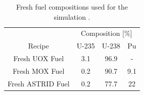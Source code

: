 \begin{table}[h]
    \centering
        \begin{tabular}{cccc}
            \hline
             & \multicolumn{3}{c}{ Composition [\%]} \\
            Recipe & U-235  & U-238  & Pu \\ 
            \hline
            Fresh \gls{UOX} Fuel & 3.1 & 96.9 & -   \\ 
            Fresh \gls{MOX} Fuel & 0.2 & 90.7 & 9.1 \\ 
            Fresh \gls{ASTRID} Fuel & 0.2 & 77.7 & 22 \\
            \hline
        \end{tabular}
        \caption{Fresh fuel compositions used for the simulation \cite{wilson_adoption_2009, varaine_pre-conceptual_2012}.}
        \label{tab:sim_result}
\end {table}
